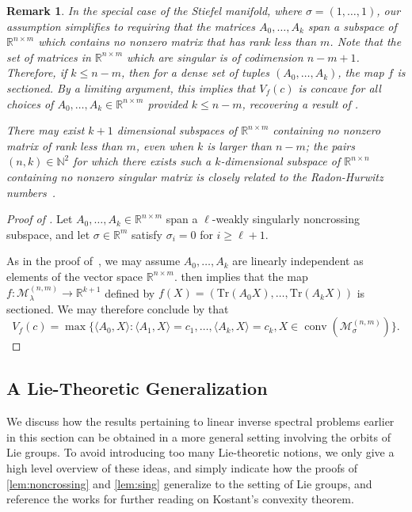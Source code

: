 \documentclass{article}
\numberwithin{equation}{section}
\newcommand{\tr}{\mathrm{Tr}}
\newcommand{\R}{\mathbb{R}}
\newcommand{\N}{\mathbb{N}}
\DeclareMathOperator*{\conv}{conv}
\newtheorem{remark}{Remark}
\newcommand{\cM}{{\mathcal{M}}}
\newcommand{\Voptf}{V_{f}}
\begin{document}
\begin{remark}
    \label{rmk:steifel}
    In the special case of the Stiefel manifold, where $\sigma = (1,\dots, 1)$, 
    our assumption  simplifies to requiring that the matrices $A_0, \dots, A_k$ span a subspace of $\R^{n \times m}$ which contains no nonzero matrix that has rank less than $m$.
    Note that the set of matrices in $\R^{n\times m}$ which are singular is of codimension $n-m+1$.
    Therefore, if $k \le n - m$, then for a dense set of tuples $(A_0, \dots, A_k)$, the map $f$ is sectioned. By a limiting argument, this implies that $\Voptf(c)$ is concave for all choices of $A_0, \dots, A_k \in \R^{n\times m}$  provided
    $k \le n-m$, recovering a result of \cite{song2024linear}.

    There may exist $k+1$ dimensional subspaces of $\R^{n\times m}$ containing no nonzero matrix of rank less than $m$, even when $k$ is larger than $n-m$; the pairs $(n,k) \in \N^2$ for which there exists such a $k$-dimensional subspace of $\R^{n\times n}$ containing no nonzero singular matrix is closely related to the Radon-Hurwitz numbers~\cite{adams1965matrices}.
\end{remark}

\begin{proof}[Proof of ] 
    Let $A_0, \dots, A_k \in \R^{n \times m}$ span a $\ell$-weakly singularly noncrossing subspace, and let $\sigma \in \R^m$ 
    satisfy $\sigma_{i} = 0$ for $i \ge \ell+1$.
    

    As in the proof of~, we may assume $A_0,\ldots, A_k$ are linearly independent as elements of the vector space $\R^{n\times m}$.
     then implies that the map $f : \cM_{\lambda}^{(n,m)} \rightarrow \R^{k+1}$ defined by $f(X) = (\tr(A_0X), \dots, \tr(A_{k}X))$ is sectioned.
    We may therefore conclude by  that 
    \[
    V_f(c) = \max \{\langle A_0, X\rangle : \langle A_1, X\rangle = c_1, \dots, \langle A_{k}, X\rangle = c_{k}, X \in \conv(\cM_{\sigma}^{(n,m)})\}.
    \]
\end{proof}

\subsection{A Lie-Theoretic Generalization}\label{subsection:lie}
We discuss how the results pertaining to linear inverse spectral problems earlier in this section can be obtained in a more general setting involving the orbits of Lie groups. 
To avoid introducing too many Lie-theoretic notions, we only give a high level overview of these ideas, and simply indicate how the proofs of \cref{lem:noncrossing} and \cref{lem:sing} generalize to the setting of Lie groups, and reference the works \cite{kostant1973convexity, dadok1985polar, kobert2022spectrahedral} 
for further reading on Kostant's convexity theorem.
\end{document}
